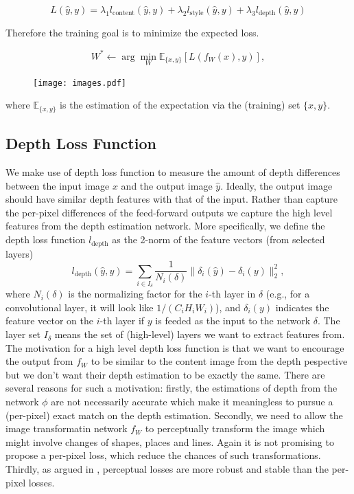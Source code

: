 \documentclass[10pt,twocolumn,letterpaper]{article}
\begin{document}
\[L(\hat y, y) = \lambda_1 l_\text{content}(\hat y, y) + \lambda_2 l_\text{style}(\hat y, y) + \lambda_3 l_\text{depth}(\hat y, y)\]

Therefore the training goal is to minimize the expected loss.

\[ W^* \gets \arg \min_W \mathbb E_{\{x,y\}}[L(f_W(x), y)], \]

\begin{figure}
\vspace*{-1in}
\hspace*{-0.7in}
\texttt{[image: images.pdf]}
\end{figure}

where $\mathbb E_{\{x,y\}}$ is the estimation of the expectation via the (training) set $\{x,y\}$.

\subsection{Depth Loss Function}
We make use of depth loss function to measure the amount of depth differences between the input image $x$ and the output image $\hat y$. Ideally, the output image should have similar depth features with that of the input. Rather than capture the per-pixel differences of the feed-forward outputs we capture the high level features from the depth estimation network. More specifically, we define the depth loss function $l_\text{depth}$ as the 2-norm of the feature vectors (from selected layers) \[l_\text{depth}(\hat y, y) = \sum_{i \in I_\delta} \frac{1}{N_i (\delta)}\|\delta_i(\hat y) - \delta_i(y)\|_2^2,\] where $N_i(\delta)$ is the normalizing factor for the $i$-th layer in $\delta$ (e.g., for a convolutional layer, it will look like $1/(C_i H_i W_i)$), and $\delta_i(y)$ indicates the feature vector on the $i$-th layer if $y$ is feeded as the input to the network $\delta$. The layer set $I_\delta$ means the set of (high-level) layers we want to extract features from. The motivation for a high level depth loss function is that we want to encourage the output from $f_W$ to be similar to the content image from the depth pespective but we don't want their depth estimation to be exactly the same. There are several reasons for such a motivation: firstly, the estimations of depth from the network $\phi$ are not necessarily accurate which make it meaningless to pursue a (per-pixel) exact match on the depth estimation. Secondly, we need to allow the image transformatin network $f_W$ to perceptually transform the image which might involve changes of shapes, places and lines. Again it is not promising to propose a per-pixel loss, which reduce the chances of such transformations. Thirdly, as argued in \cite{johnson2016perceptual}, perceptual losses are more robust and stable than the per-pixel losses.
\end{document}
